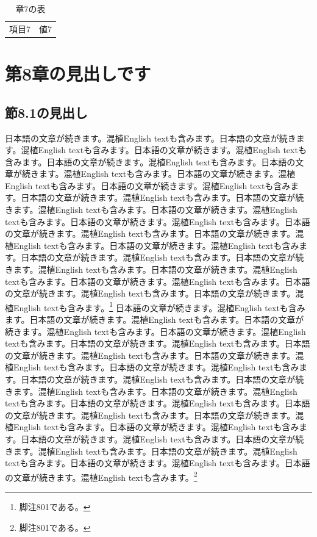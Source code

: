 \documentclass[pdflatex,book]{jlreq}
\begin{document}
\begin{table}[htbp]\centering\caption{章7の表}\begin{tabular}{cc}項目7 & 値7\\\end{tabular}\end{table}

\chapter{第8章の見出しです}
\section{節8.1の見出し}
日本語の文章が続きます。混植English textも含みます。日本語の文章が続きます。混植English textも含みます。日本語の文章が続きます。混植English textも含みます。日本語の文章が続きます。混植English textも含みます。日本語の文章が続きます。混植English textも含みます。日本語の文章が続きます。混植English textも含みます。日本語の文章が続きます。混植English textも含みます。日本語の文章が続きます。混植English textも含みます。日本語の文章が続きます。混植English textも含みます。日本語の文章が続きます。混植English textも含みます。日本語の文章が続きます。混植English textも含みます。日本語の文章が続きます。混植English textも含みます。日本語の文章が続きます。混植English textも含みます。日本語の文章が続きます。混植English textも含みます。日本語の文章が続きます。混植English textも含みます。日本語の文章が続きます。混植English textも含みます。日本語の文章が続きます。混植English textも含みます。日本語の文章が続きます。混植English textも含みます。日本語の文章が続きます。混植English textも含みます。日本語の文章が続きます。混植English textも含みます。\footnote{脚注801である。}
日本語の文章が続きます。混植English textも含みます。日本語の文章が続きます。混植English textも含みます。日本語の文章が続きます。混植English textも含みます。日本語の文章が続きます。混植English textも含みます。日本語の文章が続きます。混植English textも含みます。日本語の文章が続きます。混植English textも含みます。日本語の文章が続きます。混植English textも含みます。日本語の文章が続きます。混植English textも含みます。日本語の文章が続きます。混植English textも含みます。日本語の文章が続きます。混植English textも含みます。日本語の文章が続きます。混植English textも含みます。日本語の文章が続きます。混植English textも含みます。日本語の文章が続きます。混植English textも含みます。日本語の文章が続きます。混植English textも含みます。日本語の文章が続きます。混植English textも含みます。日本語の文章が続きます。混植English textも含みます。日本語の文章が続きます。混植English textも含みます。日本語の文章が続きます。混植English textも含みます。日本語の文章が続きます。混植English textも含みます。日本語の文章が続きます。混植English textも含みます。\footnote{脚注801である。}
\end{document}
